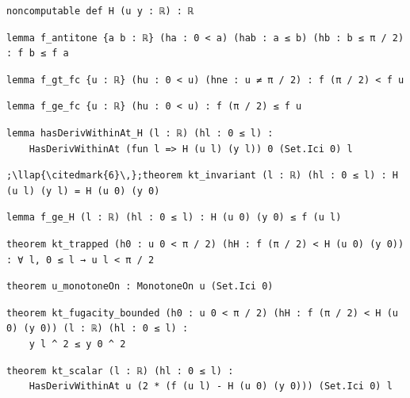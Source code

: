 \begin{lstlisting}[style=leancat]
noncomputable def H (u y : ℝ) : ℝ
\end{lstlisting}

\begin{lstlisting}[style=leancat]
lemma f_antitone {a b : ℝ} (ha : 0 < a) (hab : a ≤ b) (hb : b ≤ π / 2) : f b ≤ f a
\end{lstlisting}

\begin{lstlisting}[style=leancat]
lemma f_gt_fc {u : ℝ} (hu : 0 < u) (hne : u ≠ π / 2) : f (π / 2) < f u
\end{lstlisting}

\begin{lstlisting}[style=leancat]
lemma f_ge_fc {u : ℝ} (hu : 0 < u) : f (π / 2) ≤ f u
\end{lstlisting}

\begin{lstlisting}[style=leancat]
lemma hasDerivWithinAt_H (l : ℝ) (hl : 0 ≤ l) :
    HasDerivWithinAt (fun l => H (u l) (y l)) 0 (Set.Ici 0) l
\end{lstlisting}

\begin{lstlisting}[style=leancat]
;\llap{\citedmark{6}\,};theorem kt_invariant (l : ℝ) (hl : 0 ≤ l) : H (u l) (y l) = H (u 0) (y 0)
\end{lstlisting}

\begin{lstlisting}[style=leancat]
lemma f_ge_H (l : ℝ) (hl : 0 ≤ l) : H (u 0) (y 0) ≤ f (u l)
\end{lstlisting}

\begin{lstlisting}[style=leancat]
theorem kt_trapped (h0 : u 0 < π / 2) (hH : f (π / 2) < H (u 0) (y 0)) : ∀ l, 0 ≤ l → u l < π / 2
\end{lstlisting}

\begin{lstlisting}[style=leancat]
theorem u_monotoneOn : MonotoneOn u (Set.Ici 0)
\end{lstlisting}

\begin{lstlisting}[style=leancat]
theorem kt_fugacity_bounded (h0 : u 0 < π / 2) (hH : f (π / 2) < H (u 0) (y 0)) (l : ℝ) (hl : 0 ≤ l) :
    y l ^ 2 ≤ y 0 ^ 2
\end{lstlisting}

\begin{lstlisting}[style=leancat]
theorem kt_scalar (l : ℝ) (hl : 0 ≤ l) :
    HasDerivWithinAt u (2 * (f (u l) - H (u 0) (y 0))) (Set.Ici 0) l
\end{lstlisting}

